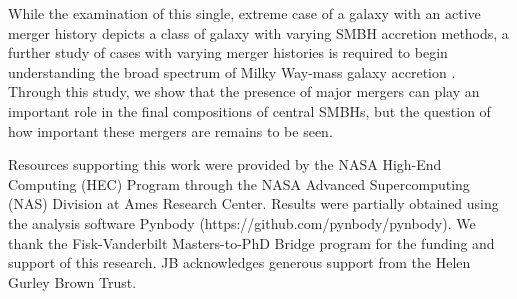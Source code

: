 \documentclass[]{emulateapj}
\begin{document}
While the examination of this single, extreme case of a galaxy with an active merger history depicts a class of galaxy with varying SMBH accretion methods, a further study of cases with varying merger histories is required to begin understanding the broad spectrum of Milky Way-mass galaxy accretion \citep{Pontzen2016}. Through this study, we show that the presence of major mergers can play an important role in the final compositions of central SMBHs, but the question of how important these mergers are remains to be seen.



\acknowledgments
Resources supporting this work were provided by the NASA High-End Computing (HEC) Program through the NASA Advanced Supercomputing (NAS) Division at Ames Research Center. Results were partially obtained using the analysis software Pynbody (https://github.com/pynbody/pynbody). We thank the Fisk-Vanderbilt Masters-to-PhD Bridge program for the funding and support of this research. JB acknowledges generous support from the Helen Gurley Brown Trust.


\end{document}
